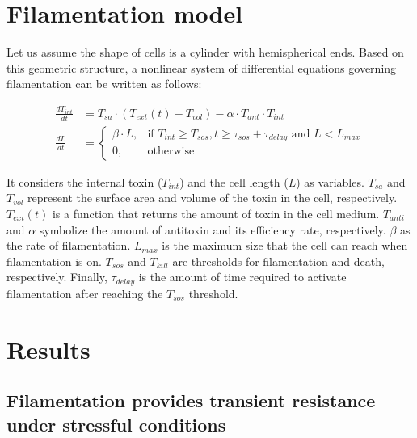 \documentclass[a4paper, nobind]{templates/ociamthesis}
\begin{document}
\hypertarget{filamentation-model}{%
\section{Filamentation model}\label{filamentation-model}}

Let us assume the shape of cells is a cylinder with hemispherical ends. Based on this geometric structure, a nonlinear system of differential equations governing filamentation can be written as follows:

\begin{equation}
\begin{split}
\frac{dT_{int}}{dt} &= T_{sa} \cdot (T_{ext}(t) - T_{vol}) - \alpha \cdot T_{ant} \cdot T_{int} \\
\frac{dL}{dt} &= 
  \begin{cases} 
    \beta \cdot L,& \text{if } T_{int} \geq T_{sos},  t \geq \tau_{sos} + \tau_{delay} \text{ and } L < L_{max}  \\
    0,            & \text{otherwise}
  \end{cases}
\end{split}
\label{eq:model-equation}
\end{equation}

It considers the internal toxin (\(T_{int}\)) and the cell length (\(L\)) as variables. \(T_{sa}\) and \(T_{vol}\) represent the surface area and volume of the toxin in the cell, respectively. \(T_{ext}(t)\) is a function that returns the amount of toxin in the cell medium. \(T_{anti}\) and \(\alpha\) symbolize the amount of antitoxin and its efficiency rate, respectively. \(\beta\) as the rate of filamentation. \(L_{max}\) is the maximum size that the cell can reach when filamentation is on. \(T_{sos}\) and \(T_{kill}\) are thresholds for filamentation and death, respectively. Finally, \(\tau_{delay}\) is the amount of time required to activate filamentation after reaching the \(T_{sos}\) threshold.

\hypertarget{results}{%
\section{Results}\label{results}}

\hypertarget{filamentation-provides-transient-resistance-under-stressful-conditions}{%
\subsection{Filamentation provides transient resistance under stressful conditions}\label{filamentation-provides-transient-resistance-under-stressful-conditions}}
\end{document}
